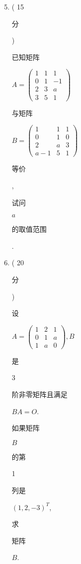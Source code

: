 \documentclass[10pt]{article}
\begin{document}
\begin{enumerate}
  \setcounter{enumi}{4}
  \item ( 15 \begin{CJK}{UTF8}{mj}分\end{CJK}) \begin{CJK}{UTF8}{mj}已知矩阵\end{CJK} $A=\left(\begin{array}{ccc}1 & 1 & 1 \\ 0 & 1 & -1 \\ 2 & 3 & a \\ 3 & 5 & 1\end{array}\right)$ \begin{CJK}{UTF8}{mj}与矩阵\end{CJK} $B=\left(\begin{array}{ccc}1 & 1 & 1 \\ 0 & 1 & 0 \\ 2 & a & 3 \\ a-1 & 5 & 1\end{array}\right)$ \begin{CJK}{UTF8}{mj}等价\end{CJK}, \begin{CJK}{UTF8}{mj}试问\end{CJK} $a$ \begin{CJK}{UTF8}{mj}的取值范围\end{CJK}.

  \item ( 20 \begin{CJK}{UTF8}{mj}分\end{CJK}) \begin{CJK}{UTF8}{mj}设\end{CJK} $A=\left(\begin{array}{lll}1 & 2 & 1 \\ 0 & 1 & a \\ 1 & a & 0\end{array}\right), B$ \begin{CJK}{UTF8}{mj}是\end{CJK} 3 \begin{CJK}{UTF8}{mj}阶非零矩阵且满足\end{CJK} $B A=O$. \begin{CJK}{UTF8}{mj}如果矩阵\end{CJK} $B$ \begin{CJK}{UTF8}{mj}的第\end{CJK} 1 \begin{CJK}{UTF8}{mj}列是\end{CJK} $(1,2,-3)^{T}$, \begin{CJK}{UTF8}{mj}求\end{CJK} \begin{CJK}{UTF8}{mj}矩阵\end{CJK} $B$.


\end{enumerate}
\end{document}

